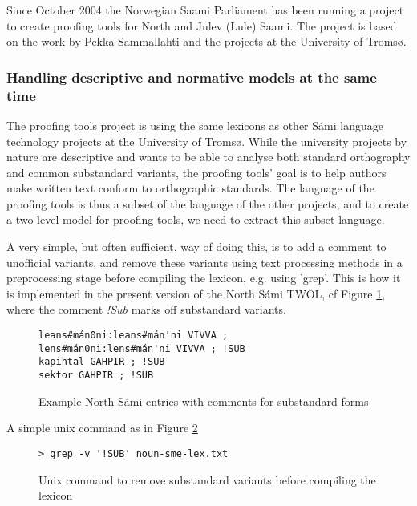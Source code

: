 \documentclass[a4paper,english]{article}
\begin{document}
Since October 2004 the Norwegian Saami Parliament has been running a project to create proofing tools for North and Julev (Lule) Saami. The project is based on the work by Pekka Sammallahti and the projects at the University of Tromsø.

\subsubsection{Handling descriptive and normative models at the same time}


The proofing tools project is using the same lexicons as other Sámi language technology projects at the University of Tromsø. While the university projects by nature are descriptive and wants to be able to analyse both standard orthography and common substandard variants, the proofing tools' goal is to help authors make written text conform to orthographic standards. The language of the proofing tools is thus a subset of the language of the other projects, and to create a two-level model for proofing tools, we need to extract this subset language.

A very simple, but often sufficient, way of doing this, is to add a comment to unofficial variants, and remove these variants using text processing methods in a preprocessing stage before compiling the lexicon, e.g. using 'grep'. This is how it is implemented in the present version of the North Sámi TWOL, cf Figure \ref{sublex}, where the comment \textit{!Sub} marks off substandard variants.

\begin{figure}[htbp]
\begin{center}
\begin{verbatim}
leans#mán0ni:leans#mán'ni VIVVA ;
lens#mán0ni:lens#mán'ni VIVVA ; !SUB
kapihtal GAHPIR ; !SUB
sektor GAHPIR ; !SUB
\end{verbatim}
\caption{Example North Sámi entries with comments for substandard forms}
\label{sublex}
\end{center}
\end{figure}

A simple unix command as in Figure \ref{grep}

\begin{figure}[htbp]
\begin{center}
\begin{verbatim}
> grep -v '!SUB' noun-sme-lex.txt
\end{verbatim}
\caption{Unix command to remove substandard variants before compiling the lexicon}
\label{grep}
\end{center}
\end{figure}
\end{document}
